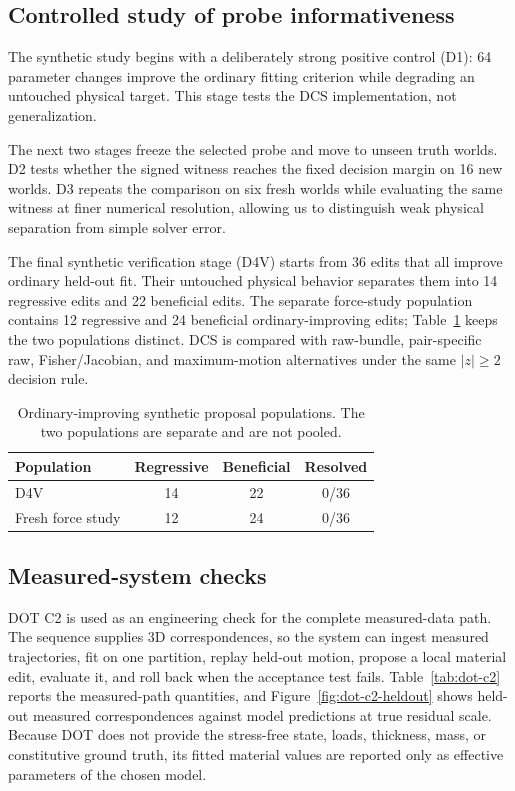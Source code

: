 \documentclass[acmtog]{acmart}
\begin{document}
\subsection{Controlled study of probe informativeness}\label{synthetic-falsification-ladder}

The synthetic study begins with a deliberately strong positive control (D1): 64 parameter changes improve the ordinary fitting criterion while degrading an untouched physical target. This stage tests the DCS implementation, not generalization.

The next two stages freeze the selected probe and move to unseen truth worlds. D2 tests whether the signed witness reaches the fixed decision margin on 16 new worlds. D3 repeats the comparison on six fresh worlds while evaluating the same witness at finer numerical resolution, allowing us to distinguish weak physical separation from simple solver error.

The final synthetic verification stage (D4V) starts from 36 edits that all improve ordinary held-out fit. Their untouched physical behavior separates them into 14 regressive edits and 22 beneficial edits. The separate force-study population contains 12 regressive and 24 beneficial ordinary-improving edits; Table~\ref{tab:populations} keeps the two populations distinct. DCS is compared with raw-bundle, pair-specific raw, Fisher/Jacobian, and maximum-motion alternatives under the same \(|z|\ge2\) decision rule.

\begin{table}[t]
\centering
\caption{Ordinary-improving synthetic proposal populations. The two populations are separate and are not pooled.}
\label{tab:populations}
\small
\begin{tabularx}{\linewidth}{@{}Xccc@{}}
\toprule
Population & Regressive & Beneficial & Resolved \\
\midrule
D4V & 14 & 22 & 0/36 \\
Fresh force study & 12 & 24 & 0/36 \\
\bottomrule
\end{tabularx}
\end{table}

\subsection{Measured-system checks}\label{measured-engineering-and-gauge-protocols}

DOT C2 is used as an engineering check for the complete measured-data path. The sequence supplies 3D correspondences, so the system can ingest measured trajectories, fit on one partition, replay held-out motion, propose a local material edit, evaluate it, and roll back when the acceptance test fails. Table~\ref{tab:dot-c2} reports the measured-path quantities, and Figure~\ref{fig:dot-c2-heldout} shows held-out measured correspondences against model predictions at true residual scale. Because DOT does not provide the stress-free state, loads, thickness, mass, or constitutive ground truth, its fitted material values are reported only as effective parameters of the chosen model.
\end{document}
